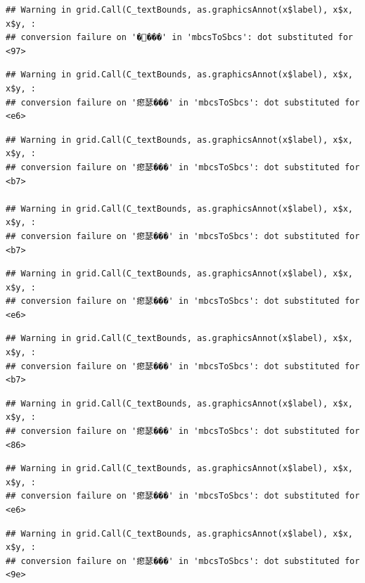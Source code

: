 \documentclass[
]{article}
\begin{document}
\begin{verbatim}
## Warning in grid.Call(C_textBounds, as.graphicsAnnot(x$label), x$x, x$y, :
## conversion failure on '����' in 'mbcsToSbcs': dot substituted for <97>
\end{verbatim}

\begin{verbatim}
## Warning in grid.Call(C_textBounds, as.graphicsAnnot(x$label), x$x, x$y, :
## conversion failure on '瘛瑟���' in 'mbcsToSbcs': dot substituted for <e6>
\end{verbatim}

\begin{verbatim}
## Warning in grid.Call(C_textBounds, as.graphicsAnnot(x$label), x$x, x$y, :
## conversion failure on '瘛瑟���' in 'mbcsToSbcs': dot substituted for <b7>

## Warning in grid.Call(C_textBounds, as.graphicsAnnot(x$label), x$x, x$y, :
## conversion failure on '瘛瑟���' in 'mbcsToSbcs': dot substituted for <b7>
\end{verbatim}

\begin{verbatim}
## Warning in grid.Call(C_textBounds, as.graphicsAnnot(x$label), x$x, x$y, :
## conversion failure on '瘛瑟���' in 'mbcsToSbcs': dot substituted for <e6>
\end{verbatim}

\begin{verbatim}
## Warning in grid.Call(C_textBounds, as.graphicsAnnot(x$label), x$x, x$y, :
## conversion failure on '瘛瑟���' in 'mbcsToSbcs': dot substituted for <b7>
\end{verbatim}

\begin{verbatim}
## Warning in grid.Call(C_textBounds, as.graphicsAnnot(x$label), x$x, x$y, :
## conversion failure on '瘛瑟���' in 'mbcsToSbcs': dot substituted for <86>
\end{verbatim}

\begin{verbatim}
## Warning in grid.Call(C_textBounds, as.graphicsAnnot(x$label), x$x, x$y, :
## conversion failure on '瘛瑟���' in 'mbcsToSbcs': dot substituted for <e6>
\end{verbatim}

\begin{verbatim}
## Warning in grid.Call(C_textBounds, as.graphicsAnnot(x$label), x$x, x$y, :
## conversion failure on '瘛瑟���' in 'mbcsToSbcs': dot substituted for <9e>
\end{verbatim}
\end{document}
